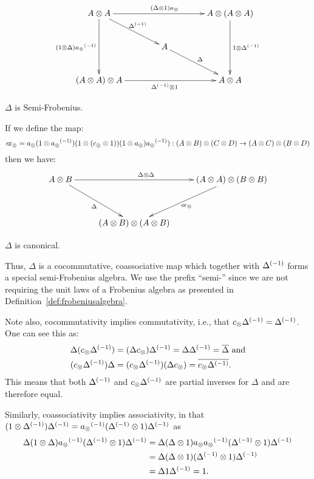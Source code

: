 \begin{definition}

  \begin{equation}
    \xymatrix @C=40pt @R=25pt{
      A \* A \ar[dd]_{(1\*\Delta) \inv{a_{\*}}} \ar[dr]^{\inv{\Delta}}
      \ar[rr]^{(\Delta \* 1) a_{\*}} & &
      A \* (A \* A) \ar[dd]^{1 \* \inv{\Delta}}\\
      & A \ar[dr]^{\Delta} & \\
      (A \* A) \* A \ar[rr]_{\inv{\Delta} \* 1} & &
      A \* A
    }\label{dia:delta-is-semi-frobenius}
  \end{equation}
  \begin{center}$\Delta$ is Semi-Frobenius.\end{center}
If we define the map:
  \[
    e\!x_{\otimes} =  a_{\otimes}(1\otimes{a_{\otimes}}^{(-1)})(1\otimes(c_{\otimes}\otimes1))(1\otimes a_{\otimes}){a_{\otimes}}^{(-1)}): (A\otimes B)\otimes(C\otimes D) \to (A\otimes C) \otimes (B\otimes D)
  \]
then we have:
  \begin{equation}
    \xymatrix @C=25pt @R=35pt{
      A \* B \ar[dr]_{\Delta}
      \ar[rr]^{\Delta \* \Delta} && (A \* A) \* (B \* B) \ar[dl]^{\excs}\\
      &(A \* B) \* (A \* B)
    }\label{dia:delta-is-canonical}
  \end{equation}
  \begin{center}$\Delta$ is canonical.\end{center}

  Thus, $\Delta$ is a cocommutative, coassociative map which together with ${\Delta}^{(-1)}$ forms a
  special semi-Frobenius algebra. We use the prefix ``semi-'' since we are not requiring the unit laws
  of a Frobenius algebra as presented in Definition~\ref{def:frobeniusalgebra}.
\end{definition}

Note also, cocommutativity implies commutativity, i.e., that $c_{\otimes}{\Delta}^{(-1)} = {\Delta}^{(-1)}$.
One can see this as:
\begin{align*}
  \Delta(c_{\otimes}{\Delta}^{(-1)})
  &= (\Delta c_{\otimes}){\Delta}^{(-1)} = \Delta{\Delta}^{(-1)} = \overline{\Delta} \text{ and}\\
  (c_{\otimes}{\Delta}^{(-1)})\Delta
  & = (c_{\otimes}{\Delta}^{(-1)})(\Delta c_{\otimes}) = \overline{c_{\otimes}{\Delta}^{(-1)}}.
\end{align*}
This means that both ${\Delta}^{(-1)}$ and $c_{\otimes}{\Delta}^{(-1)}$ are partial inverses for $\Delta$
and are therefore equal.

Similarly, coassociativity implies associativity, in that
$(1\otimes{\Delta}^{(-1)}){\Delta}^{(-1)} =  {a_{\otimes}}^{(-1)}({\Delta}^{(-1)}\otimes 1){\Delta}^{(-1)}$ as
\begin{align*}
  \Delta(1\otimes\Delta){a_{\otimes}}^{(-1)}({\Delta}^{(-1)}\otimes 1){\Delta}^{(-1)} &=
  \Delta(\Delta\otimes1)a_{\otimes}{a_{\otimes}}^{(-1)}({\Delta}^{(-1)}\otimes 1){\Delta}^{(-1)} \\
  & =\Delta(\Delta\otimes1)({\Delta}^{(-1)}\otimes 1){\Delta}^{(-1)} \\
  & =\Delta 1{\Delta}^{(-1)} = 1.
\end{align*}

